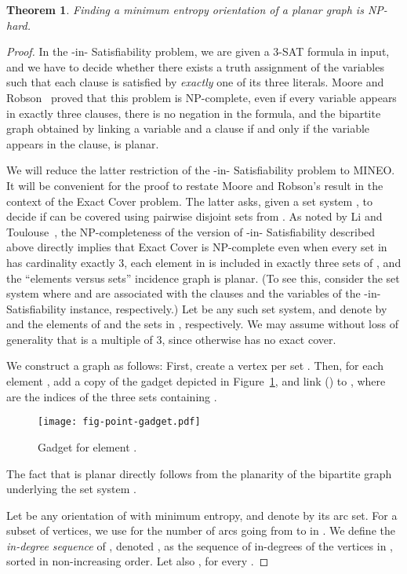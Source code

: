 \documentclass[11pt]{article}
\newtheorem{theorem}{Theorem}
\begin{document}
\begin{theorem}
\label{th-NPhard}
Finding a minimum entropy orientation of a planar graph is NP-hard.
\end{theorem}
\begin{proof}
In the -in- Satisfiability problem, we are given a 3-SAT formula in input, and we have to decide whether there exists a truth assignment of the variables such that each clause is satisfied by {\em exactly} one of its three literals. Moore and Robson~\cite{MR01} proved that this problem is NP-complete, even if every variable appears in exactly three clauses, there is no negation in the formula, 
and the bipartite graph obtained by linking a variable and a clause if and only if the variable appears in the clause, is planar.

We will reduce the latter restriction of the -in- Satisfiability problem to MINEO. It will be convenient for the proof to restate Moore and Robson's result in the context of the Exact Cover problem. The latter asks, given a set system , to decide if  can be covered using pairwise disjoint sets from . As noted by Li and Toulouse~\cite{LT06}, the NP-completeness of the version of -in- Satisfiability described above directly implies that Exact Cover is NP-complete even when every set in  has cardinality exactly 3, each element in  is included in exactly three sets of , and the ``elements versus sets'' incidence graph is planar. (To see this, consider the set system  where  and  are associated with the clauses and the variables of the -in- Satisfiability instance, respectively.) Let  be any such set system, and denote by  and  the elements of  and the sets in , respectively.
We may assume without loss of generality that  is a multiple of 3, since otherwise
  has no exact cover.

We construct a graph  as follows: First, create a vertex  per set . Then, for each element , add a copy of the gadget depicted in Figure~\ref{fig-point-gadget}, and link  () to , where  are the indices of the three sets containing . 
\begin{figure}
\centering
\texttt{[image: fig-point-gadget.pdf]}
\caption{\label{fig-point-gadget}Gadget for element .}
\end{figure}
The fact that  is planar directly follows from the planarity of the bipartite graph underlying the set system . 

Let  be any orientation of  with minimum entropy, and denote by  its arc set. For a subset  of vertices,
we use  for the number of arcs going from  to  in . We define  the {\em in-degree sequence} of , denoted , as the sequence of in-degrees of the vertices in , sorted in non-increasing order. Let also , for every .


\end{proof}
\end{document}
